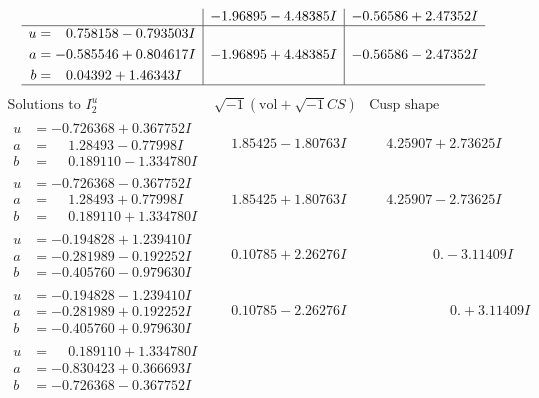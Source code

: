 \documentclass[1p]{elsarticle_modified}
\theoremstyle{definition}
\newcommand{\I}{\sqrt{-1}}
\begin{document}
$$\begin{array}{c|c|c}
 & -1.96895 - 4.48385 I & -0.56586 + 2.47352 I \\ \hline\begin{aligned}
u &= \phantom{-}0.758158 - 0.793503 I \\
a &= -0.585546 + 0.804617 I \\
b &= \phantom{-}0.04392 + 1.46343 I\end{aligned}
 & -1.96895 + 4.48385 I & -0.56586 - 2.47352 I\\
 \hline 
 \end{array}$$\newpage$$\begin{array}{c|c|c}  
\text{Solutions to }I^u_{2}& \I (\text{vol} + \sqrt{-1}CS) & \text{Cusp shape}\\
 \hline 
\begin{aligned}
u &= -0.726368 + 0.367752 I \\
a &= \phantom{-}1.28493 - 0.77998 I \\
b &= \phantom{-}0.189110 - 1.334780 I\end{aligned}
 & \phantom{-}1.85425 - 1.80763 I & \phantom{-}4.25907 + 2.73625 I \\ \hline\begin{aligned}
u &= -0.726368 - 0.367752 I \\
a &= \phantom{-}1.28493 + 0.77998 I \\
b &= \phantom{-}0.189110 + 1.334780 I\end{aligned}
 & \phantom{-}1.85425 + 1.80763 I & \phantom{-}4.25907 - 2.73625 I \\ \hline\begin{aligned}
u &= -0.194828 + 1.239410 I \\
a &= -0.281989 - 0.192252 I \\
b &= -0.405760 - 0.979630 I\end{aligned}
 & \phantom{-}0.10785 + 2.26276 I & \phantom{-0.000000 } 0. - 3.11409 I \\ \hline\begin{aligned}
u &= -0.194828 - 1.239410 I \\
a &= -0.281989 + 0.192252 I \\
b &= -0.405760 + 0.979630 I\end{aligned}
 & \phantom{-}0.10785 - 2.26276 I & \phantom{-0.000000 -}0. + 3.11409 I \\ \hline\begin{aligned}
u &= \phantom{-}0.189110 + 1.334780 I \\
a &= -0.830423 + 0.366693 I \\
b &= -0.726368 - 0.367752 I\end{aligned}

\end{array}$$
\end{document}
